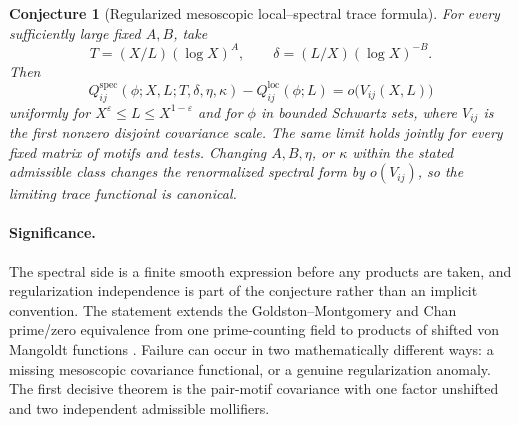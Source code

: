 \documentclass[11pt]{article}
\newtheorem{conjecture}{Conjecture}
\theoremstyle{definition}
\newcommand{\eps}{\varepsilon}
\begin{document}
\begin{conjecture}[Regularized mesoscopic local--spectral trace formula]
For every sufficiently large fixed $A,B$, take
\[
 T=(X/L)(\log X)^A,
 \qquad
 \delta=(L/X)(\log X)^{-B}.
\]
Then
\[
 Q^{\mathrm{spec}}_{ij}(\phi;X,L;T,\delta,\eta,\kappa)
 -Q^{\mathrm{loc}}_{ij}(\phi;L)
 =o\bigl(V_{ij}(X,L)\bigr)
\]
uniformly for $X^\eps\le L\le X^{1-\eps}$ and for $\phi$ in bounded Schwartz sets,
where $V_{ij}$ is the first nonzero disjoint covariance scale.  The same limit holds
jointly for every fixed matrix of motifs and tests.  Changing $A,B,\eta$, or $\kappa$
within the stated admissible class changes the renormalized spectral form by
$o(V_{ij})$, so the limiting trace functional is canonical.
\end{conjecture}

\paragraph{Significance.}
The spectral side is a finite smooth expression before any products are taken, and
regularization independence is part of the conjecture rather than an implicit
convention.  The statement extends the Goldston--Montgomery and Chan prime/zero
equivalence from one prime-counting field to products of shifted von Mangoldt functions
\cite{GM,Chan}.  Failure can occur in two mathematically different ways: a missing
mesoscopic covariance functional, or a genuine regularization anomaly.  The first
decisive theorem is the pair-motif covariance with one factor unshifted and two
independent admissible mollifiers.
\end{document}
